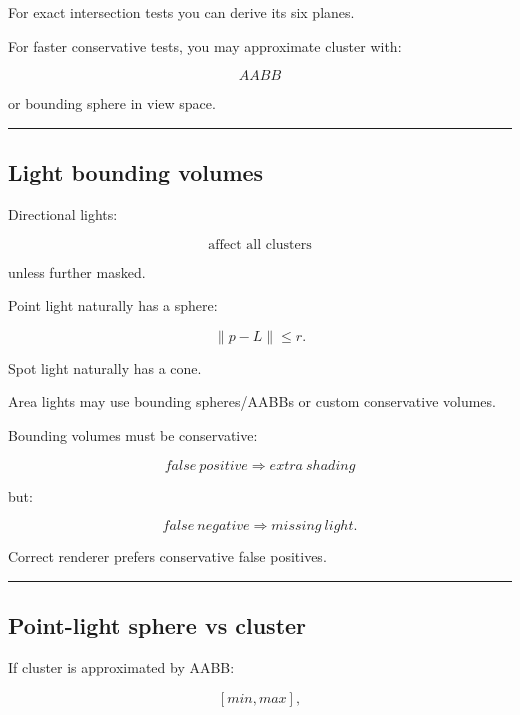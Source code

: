 For exact intersection tests you can derive its six planes.

For faster conservative tests, you may approximate cluster with:

\[
AABB
\]

or bounding sphere in view space.

\begin{center}\rule{0.5\linewidth}{0.5pt}\end{center}

\subsection{Light bounding volumes}\label{04-visual-computing-ii-ch040-light-bounding-volumes}

\hypertarget{04-visual-computing-ii-ch040-light-bounding-volumes}{}

Directional lights:

\[
\boxed{\text{affect all clusters}}
\]

unless further masked.

Point light naturally has a sphere:

\[
\|p-L\|\le r.
\]

Spot light naturally has a cone.

Area lights may use bounding spheres/AABBs or custom conservative volumes.

Bounding volumes must be conservative:

\[
\boxed{
false\ positive
\Rightarrow
extra\ shading
}
\]

but:

\[
\boxed{
false\ negative
\Rightarrow
missing\ light.
}
\]

Correct renderer prefers conservative false positives.

\begin{center}\rule{0.5\linewidth}{0.5pt}\end{center}

\subsection{Point-light sphere vs cluster}\label{04-visual-computing-ii-ch040-point-light-sphere-vs-cluster}

\hypertarget{04-visual-computing-ii-ch040-point-light-sphere-vs-cluster}{}

If cluster is approximated by AABB:

\[
[min,max],
\]

